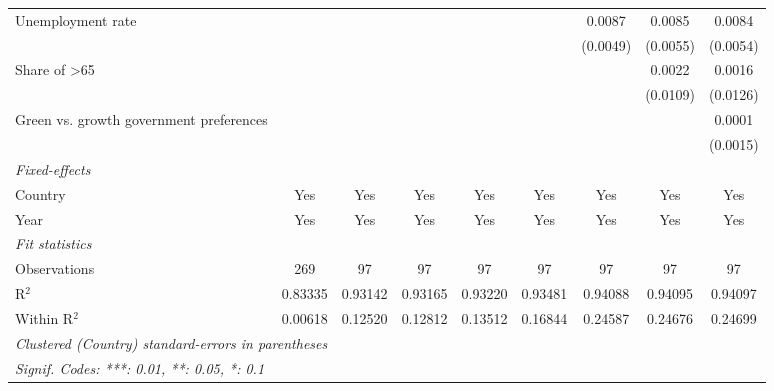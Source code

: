 \begin{table}[htbp]
\begin{tabular}{lcccccccc}
      Unemployment rate                       &          &              &              &              &               & 0.0087        & 0.0085        & 0.0084\\   
                                              &          &              &              &              &               & (0.0049)      & (0.0055)      & (0.0054)\\   
      Share of >65                            &          &              &              &              &               &               & 0.0022        & 0.0016\\   
                                              &          &              &              &              &               &               & (0.0109)      & (0.0126)\\   
      Green vs. growth government preferences &          &              &              &              &               &               &               & 0.0001\\   
                                              &          &              &              &              &               &               &               & (0.0015)\\   
      \midrule
      \emph{Fixed-effects}\\
      Country                                 & Yes      & Yes          & Yes          & Yes          & Yes           & Yes           & Yes           & Yes\\  
      Year                                    & Yes      & Yes          & Yes          & Yes          & Yes           & Yes           & Yes           & Yes\\  
      \midrule
      \emph{Fit statistics}\\
      Observations                            & 269      & 97           & 97           & 97           & 97            & 97            & 97            & 97\\  
      R$^2$                                   & 0.83335  & 0.93142      & 0.93165      & 0.93220      & 0.93481       & 0.94088       & 0.94095       & 0.94097\\  
      Within R$^2$                            & 0.00618  & 0.12520      & 0.12812      & 0.13512      & 0.16844       & 0.24587       & 0.24676       & 0.24699\\  
      \midrule \midrule
      \multicolumn{9}{l}{\emph{Clustered (Country) standard-errors in parentheses}}\\
      \multicolumn{9}{l}{\emph{Signif. Codes: ***: 0.01, **: 0.05, *: 0.1}}\\
   \end{tabular}
\end{table}


